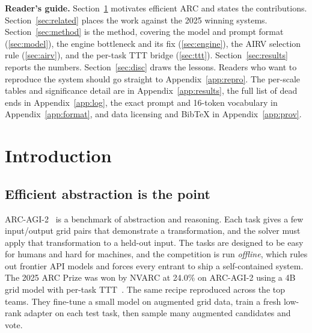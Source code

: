 \documentclass[11pt]{article}
\begin{document}
{\small\tableofcontents}
\medskip

\noindent\textbf{Reader's guide.} Section~\ref{sec:intro} motivates efficient ARC and states the
contributions. Section~\ref{sec:related} places the work against the 2025 winning systems.
Section~\ref{sec:method} is the method, covering the model and prompt format (\ref{sec:model}), the engine
bottleneck and its fix (\ref{sec:engine}), the AIRV selection rule (\ref{sec:airv}), and the per-task
TTT bridge (\ref{sec:ttt}). Section~\ref{sec:results} reports the numbers. Section~\ref{sec:disc}
draws the lessons. Readers who want to reproduce the system should go straight to
Appendix~\ref{app:repro}. The per-scale tables and significance detail are in
Appendix~\ref{app:results}, the full list of dead ends in Appendix~\ref{app:log}, the exact prompt
and 16-token vocabulary in Appendix~\ref{app:format}, and data licensing and BibTeX in
Appendix~\ref{app:prov}.

\section{Introduction}
\label{sec:intro}

\subsection{Efficient abstraction is the point}
ARC-AGI-2~\cite{chollet,arcagi2} is a benchmark of abstraction and reasoning. Each task gives a few
input/output grid pairs that demonstrate a transformation, and the solver must apply that
transformation to a held-out input. The tasks are designed to be easy for humans and hard for
machines, and the competition is run \emph{offline}, which rules out frontier API models and forces
every entrant to ship a self-contained system. The 2025 ARC Prize was won by NVARC at 24.0\% on
ARC-AGI-2 using a 4B grid model with per-task TTT~\cite{arc2025,nvarc}. The same recipe reproduced
across the top teams. They fine-tune a small model on augmented grid data, train a fresh low-rank
adapter on each test task, then sample many augmented candidates and vote.
\end{document}

